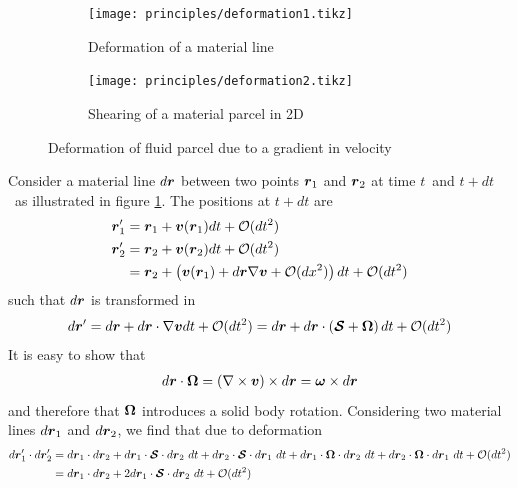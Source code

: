 \begin{figure}
  \begin{subfigure}{0.35\textwidth}
    \centering
    \texttt{[image: principles/deformation1.tikz]}
    \caption{Deformation of a material line}
    \label{fig:deformation}
  \end{subfigure}
  \hfill
  \begin{subfigure}{0.6\textwidth}
    \centering
    \texttt{[image: principles/deformation2.tikz]}
    \caption{Shearing of a material parcel in 2D}
    \label{fig:shear}
  \end{subfigure}
  \caption{Deformation of fluid parcel due to a gradient in velocity}
\end{figure}
Consider a material line $d\boldsymbol {r}$ between two points $\boldsymbol {r}_1$ and
$\boldsymbol {r}_2$ at time $t$~and $t+dt$~as illustrated in figure
\ref{fig:deformation}. The positions at $t+dt$ are
\begin{align*}
  \boldsymbol {r}_1^\prime &= \boldsymbol {r}_1 + \boldsymbol {v}(\boldsymbol {r}_1) dt + \mathcal O(dt^2)\\
  \boldsymbol {r}_2^\prime &= \boldsymbol {r}_2 + \boldsymbol {v}(\boldsymbol {r}_2) dt + \mathcal O(dt^2)\\
  &= \boldsymbol {r}_2 + 
  \left(\boldsymbol {v}(\boldsymbol {r}_1) + 
    d\boldsymbol {r} \nabla \boldsymbol {v} + 
  \mathcal O(dx^2)\right) dt + \mathcal O(dt^2)
\end{align*}
such that $d\boldsymbol {r}$ is transformed in 
\begin{align*} 
  d\boldsymbol {r}^\prime = d\boldsymbol {r} + d\boldsymbol {r} \cdot \nabla \boldsymbol {v} dt + \mathcal
  O(dt^2) = d\boldsymbol {r} + d\boldsymbol {r} \cdot \left(\boldsymbol {\mathcal S} + \boldsymbol {\Omega}\right)
  dt + \mathcal O(dt^2)
\end{align*}
It is easy to show that 
\begin{align*}
  d\boldsymbol {r} \cdot \boldsymbol {\Omega} = \left(\nabla \times \boldsymbol {v}\right) \times d \boldsymbol {r} =
  \boldsymbol{\omega} \times d\boldsymbol {r}
\end{align*}
and therefore that $\boldsymbol {\Omega}$ introduces a solid body rotation.
Considering two material lines $d\boldsymbol {r}_1$ and $d\boldsymbol {r}_2$, we find that
due to deformation
\begin{align*}
  d\boldsymbol {r}_1^\prime \cdot d\boldsymbol {r}_2^\prime 
  &= d\boldsymbol {r}_1 \cdot d \boldsymbol {r}_2 +  
  d\boldsymbol {r}_1 \cdot \boldsymbol {\boldsymbol {\mathcal S}} \cdot d\boldsymbol {r}_2 ~dt + 
  d\boldsymbol {r}_2 \cdot \boldsymbol {\boldsymbol {\mathcal S}} \cdot d\boldsymbol {r}_1 ~dt + 
  d\boldsymbol {r}_1 \cdot \boldsymbol {\Omega} \cdot d\boldsymbol {r}_2 ~dt + 
  d\boldsymbol {r}_2 \cdot \boldsymbol {\Omega} \cdot d\boldsymbol {r}_1 ~dt + 
  \mathcal O(dt^2)\\
  &= 
  d\boldsymbol {r}_1 \cdot d \boldsymbol {r}_2 + 
  2 d\boldsymbol {r}_1 \cdot \boldsymbol {\boldsymbol {\mathcal S}} \cdot d\boldsymbol {r}_2 ~dt + 
  \mathcal O(dt^2) \\
\end{align*}
